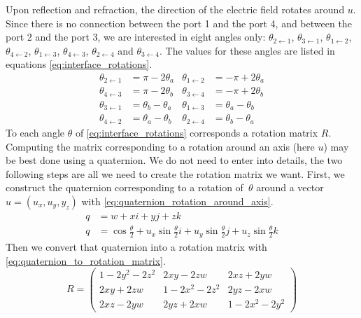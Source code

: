 Upon reflection and refraction, the direction of the electric field rotates around $u$.
Since there is no connection between the port 1 and the port 4, and between the port 2 and the port 3, we are interested in eight angles only:
$\theta_{2 \leftarrow 1}$, $\theta_{3 \leftarrow 1}$,
$\theta_{1 \leftarrow 2}$, $\theta_{4 \leftarrow 2}$,
$\theta_{1 \leftarrow 3}$, $\theta_{4 \leftarrow 3}$,
$\theta_{2 \leftarrow 4}$ and $\theta_{3 \leftarrow 4}$.
The values for these angles are listed in equations \cref{eq:interface_rotations}.
\begin{equation}
    \begin{aligned}
        \theta_{2 \leftarrow 1} &= \pi - 2\theta_a
        &
        \theta_{1 \leftarrow 2} &= -\pi + 2\theta_a
        \\
        \theta_{4 \leftarrow 3} &= \pi - 2\theta_b
        &
        \theta_{3 \leftarrow 4} &= -\pi + 2\theta_b
        \\
        \theta_{3 \leftarrow 1} &= \theta_b - \theta_a
        &
        \theta_{1 \leftarrow 3} &= \theta_a - \theta_b
        \\
        \theta_{4 \leftarrow 2} &= \theta_a - \theta_b
        &
        \theta_{2 \leftarrow 4} &= \theta_b - \theta_a
    \end{aligned}
    \label{eq:interface_rotations}
\end{equation}
To each angle $\theta$ of \cref{eq:interface_rotations} corresponds a rotation matrix $R$.
Computing the matrix corresponding to a rotation around an axis (here $u$) may be best done using a quaternion.
We do not need to enter into details, the two following steps are all we need to create the rotation matrix we want.
First, we construct the quaternion corresponding to a rotation of~$\theta$ around a vector $u=(u_x, u_y, y_z)$ with
\cref{eq:quaternion_rotation_around_axis}.
\begin{equation}
    \begin{aligned}
        q &= w + xi + yj + zk
        \\
        q &= \cos \frac{\theta}{2}
           + u_x \sin \frac{\theta}{2} i
           + u_y \sin \frac{\theta}{2} j
           + u_z \sin \frac{\theta}{2} k
    \end{aligned}
    \label{eq:quaternion_rotation_around_axis}
\end{equation}
Then we convert that quaternion into a rotation matrix with  \cref{eq:quaternion_to_rotation_matrix}.
\begin{equation}
    R =
    \begin{pmatrix}
        1 - 2y^2 - 2z^2   &   2xy - 2zw         &   2xz + 2yw \\
        2xy + 2zw         &   1 - 2x^2 - 2z^2   &   2yz - 2xw \\
        2xz - 2yw         &   2yz + 2xw         &   1 - 2x^2 - 2y^2
    \end{pmatrix}
    \label{eq:quaternion_to_rotation_matrix}
\end{equation}


